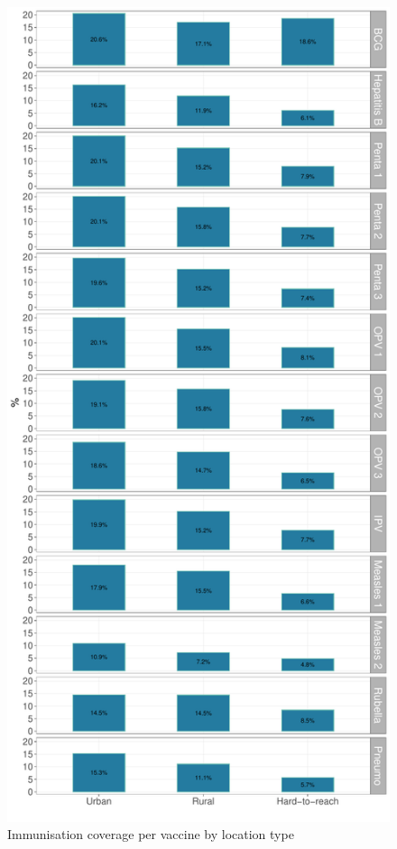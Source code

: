 \documentclass[12pt,a4paper]{article}
\begin{document}
\begin{figure}[H]

{\centering \includegraphics{kayahReport_files/figure-latex/epi3plot-1} 

}

\caption{Immunisation coverage per vaccine by location type}\label{fig:epi3plot}
\end{figure}
\end{document}
